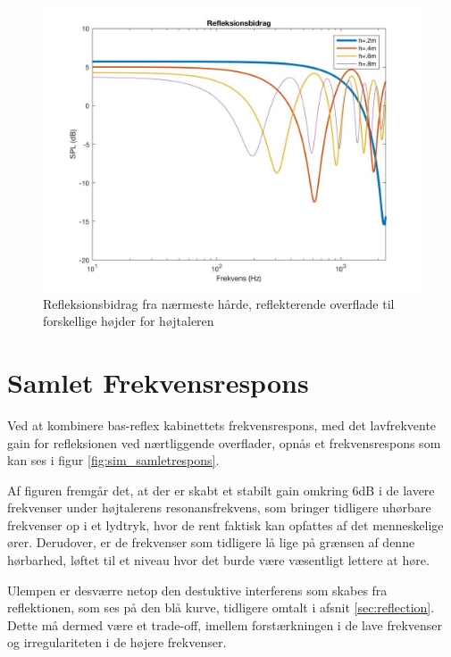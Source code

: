 \begin{figure}[h!]
	\centering
	\includegraphics[width=\textwidth]{Pics/refleksionsbidrag}
	\caption{Refleksionsbidrag fra nærmeste hårde, reflekterende overflade til forskellige højder for højtaleren } 
	\label{fig:refleksionsbidrag}
\end{figure}




\section{Samlet Frekvensrespons}

Ved at kombinere bas-reflex kabinettets frekvensrespons, med det lavfrekvente gain for refleksionen ved nærtliggende overflader, opnås et frekvensrespons som kan ses i figur \ref{fig:sim_samletrespons}.

Af figuren fremgår det, at der er skabt et stabilt gain omkring 6dB i de lavere frekvenser under højtalerens resonansfrekvens, som bringer tidligere uhørbare frekvenser op i et lydtryk, hvor de rent faktisk kan opfattes af det menneskelige ører. Derudover, er de frekvenser som tidligere lå lige på grænsen af denne hørbarhed, løftet til et niveau hvor det burde være væsentligt lettere at høre.

Ulempen er desværre netop den destuktive interferens som skabes fra reflektionen, som ses på den blå kurve, tidligere omtalt i afsnit \ref{sec:reflection}.\\
Dette må dermed være et trade-off, imellem forstærkningen i de lave frekvenser og irregulariteten i de højere frekvenser. 

